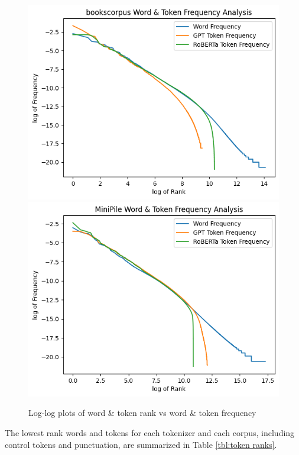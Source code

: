 \documentclass[11pt]{article}
\begin{document}
\begin{figure}[t]
  \includegraphics[width=\columnwidth]{../visualizations/bookscorpusfreq.png}
  \includegraphics[width=\columnwidth]{../visualizations/minipilecorpusfreq.png}
  \caption{Log-log plots of word \& token rank vs word \& token frequency}
  \label{fig:experiments}
\end{figure}

The lowest rank words and tokens for each tokenizer and each corpus, including control tokens and punctuation, are summarized in Table \ref{tbl:token ranks}.
\end{document}
